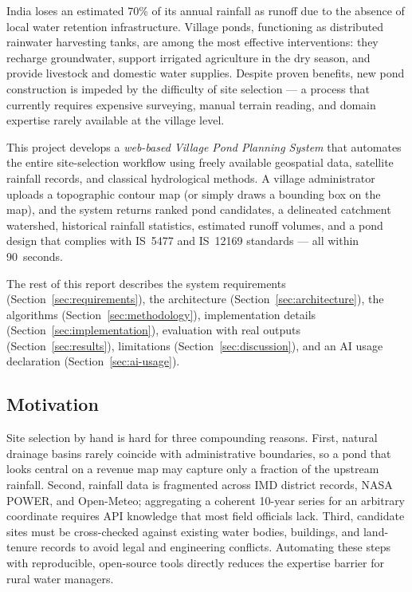 \documentclass[manuscript,screen,review,nonacm]{acmart}
\begin{document}
India loses an estimated 70\% of its annual rainfall as runoff due to
the absence of local water retention infrastructure. Village ponds,
functioning as distributed rainwater harvesting tanks, are among the most
effective interventions: they recharge groundwater, support irrigated
agriculture in the dry season, and provide livestock and domestic water
supplies. Despite proven benefits, new pond construction is impeded by the
difficulty of site selection --- a process that currently requires
expensive surveying, manual terrain reading, and domain expertise rarely
available at the village level.

This project develops a \emph{web-based Village Pond Planning System} that
automates the entire site-selection workflow using freely available
geospatial data, satellite rainfall records, and classical hydrological
methods. A village administrator uploads a topographic contour map (or
simply draws a bounding box on the map), and the system returns ranked pond
candidates, a delineated catchment watershed, historical rainfall
statistics, estimated runoff volumes, and a pond design that complies with
IS~5477 and IS~12169 standards --- all within 90~seconds.

The rest of this report describes the system requirements
(Section~\ref{sec:requirements}), the architecture
(Section~\ref{sec:architecture}), the algorithms
(Section~\ref{sec:methodology}), implementation details
(Section~\ref{sec:implementation}), evaluation with real outputs
(Section~\ref{sec:results}), limitations (Section~\ref{sec:discussion}),
and an AI usage declaration (Section~\ref{sec:ai-usage}).

\subsection{Motivation}

Site selection by hand is hard for three compounding reasons. First,
natural drainage basins rarely coincide with administrative boundaries, so
a pond that looks central on a revenue map may capture only a fraction of
the upstream rainfall. Second, rainfall data is fragmented across IMD
district records, NASA POWER, and Open-Meteo; aggregating a coherent
10-year series for an arbitrary coordinate requires API knowledge that
most field officials lack. Third, candidate sites must be cross-checked
against existing water bodies, buildings, and land-tenure records to avoid
legal and engineering conflicts. Automating these steps with reproducible,
open-source tools directly reduces the expertise barrier for rural water
managers.
\end{document}
